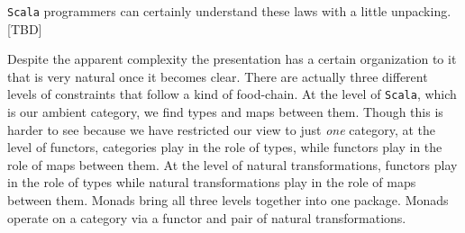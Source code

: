\texttt{Scala} programmers can certainly understand these laws with a
little unpacking. [TBD]

Despite the apparent complexity the presentation has a certain
organization to it that is very natural once it becomes clear. There
are actually three different levels of constraints that follow a kind
of food-chain. At the level of \texttt{Scala}, which is our ambient
category, we find types and maps between them. Though this is harder
to see because we have restricted our view to just \emph{one}
category, at the level of functors, categories play in the role of
types, while functors play in the role of maps between them. At the
level of natural transformations, functors play in the role of types
while natural transformations play in the role of maps between
them. Monads bring all three levels together into one package. Monads
operate on a category via a functor and pair of natural
transformations.








